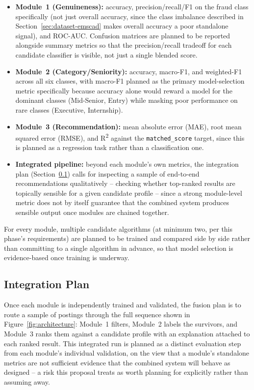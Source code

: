 \documentclass[11pt,a4paper]{article}
\begin{document}
\begin{itemize}
    \item \textbf{Module~1 (Genuineness):} accuracy, precision/recall/F1 on the fraud
    class specifically (not just overall accuracy, since the class imbalance described
    in Section~\ref{sec:dataset-emscad} makes overall accuracy a poor standalone signal),
    and ROC-AUC. Confusion matrices are planned to be reported alongside summary metrics
    so that the precision/recall tradeoff for each candidate classifier is visible, not
    just a single blended score.
    \item \textbf{Module~2 (Category/Seniority):} accuracy, macro-F1, and weighted-F1
    across all six classes, with macro-F1 planned as the primary model-selection metric
    specifically because accuracy alone would reward a model for the dominant classes
    (Mid-Senior, Entry) while masking poor performance on rare classes (Executive,
    Internship).
    \item \textbf{Module~3 (Recommendation):} mean absolute error (MAE), root mean
    squared error (RMSE), and R\textsuperscript{2} against the \texttt{matched\_score}
    target, since this is planned as a regression task rather than a classification one.
    \item \textbf{Integrated pipeline:} beyond each module's own metrics, the
    integration plan (Section~\ref{sec:integration}) calls for inspecting a sample of
    end-to-end recommendations qualitatively -- checking whether top-ranked results are
    topically sensible for a given candidate profile -- since a strong module-level
    metric does not by itself guarantee that the combined system produces sensible
    output once modules are chained together.
\end{itemize}

For every module, multiple candidate algorithms (at minimum two, per this phase's
requirements) are planned to be trained and compared side by side rather than
committing to a single algorithm in advance, so that model selection is evidence-based
once training is underway.

\subsection{Integration Plan}
\label{sec:integration}

Once each module is independently trained and validated, the fusion plan is to route a
sample of postings through the full sequence shown in Figure~\ref{fig:architecture}:
Module~1 filters, Module~2 labels the survivors, and Module~3 ranks them against a
candidate profile with an explanation attached to each ranked result. This integrated
run is planned as a distinct evaluation step from each module's individual validation,
on the view that a module's standalone metrics are not sufficient evidence that the
combined system will behave as designed -- a risk this proposal treats as worth planning
for explicitly rather than assuming away.
\end{document}
